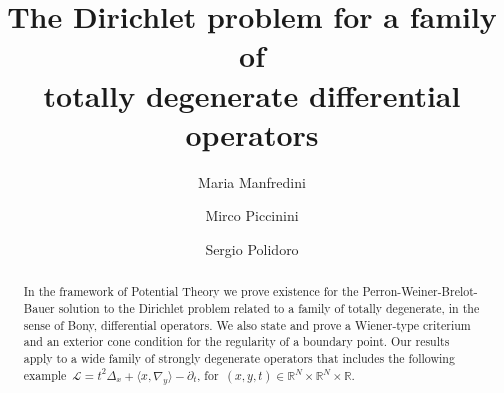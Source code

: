 \documentclass{amsart}
\numberwithin{equation}{section}
\def \R {{\mathbb {R}}}
\def \Lc{{\mathcal{L}}}
\begin{document}

\title[Totally degenerate differential operators]{The Dirichlet problem  for a family of \\ totally degenerate differential operators}


\author[M. Manfredini]{Maria Manfredini}  \address[M. Manfredini]{Dipartimento di Scienze Fisiche, Informatiche e Matematiche,
\newline\indent Universit\`a degli Studi di Modena e Reggio Emilia
 \newline\indent Via G. Campi 213/B, 41121 Modena, Italy} 

\author[M. Piccinini]{Mirco Piccinini}  \address[M. Piccinini]{Dipartimento di Matematica, \newline\indent Universit\`a di Pisa,
\newline\indent ~L.go~B.~Pontecorvo~5, 56127, Pisa, Italy}

\author[S. Polidoro]{Sergio Polidoro}  \address[S. Polidoro]{Dipartimento di Scienze Fisiche, Informatiche e Matematiche, \newline\indent Universit\`a degli Studi di Modena e Reggio Emilia,
  \newline\indent Via G. Campi 213/B, 41121 Modena, Italy} 



\makeatletter
{}
\makeatother



 \begin{abstract}
   In the framework of  Potential Theory we prove existence
   for the  Perron-Weiner-Brelot-Bauer solution
   to the Dirichlet problem related to a family of totally degenerate, in the sense of Bony, differential operators. We also state and prove a Wiener-type criterium and an exterior cone condition for the regularity of a boundary point.
  Our results apply to a wide family of strongly degenerate operators that includes the following example~$\Lc = t^2\Delta_x + \langle x, \nabla_y \rangle -\partial_t$, for~$(x,y,t) \in \R^N \times \R^{N} \times \R$.
\end{abstract}
\end{document}
